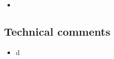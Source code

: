 \documentclass{scrartcl}
\begin{document}
\begin{itemize}
    \item {\color{blue}}

\end{itemize}

\subsection*{Technical comments}
\begin{itemize}
    
    \item {\color{blue} d}

\end{itemize}
\end{document}
